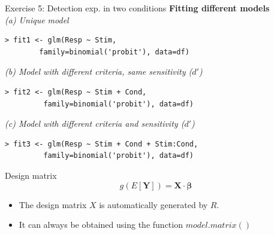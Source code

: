 \documentclass[10pt]{beamer}
\begin{document}
\begin{frame}[fragile]{Exercise 5: Detection exp. in two conditions}
\textbf{Fitting different models}\\[10pt]
\textit{(a) Unique model}
\begin{verbatim}
> fit1 <- glm(Resp ~ Stim, 
        family=binomial('probit'), data=df)
\end{verbatim}

\textit{(b) Model with different criteria, same sensitivity ($d'$)}
\begin{verbatim}
> fit2 <- glm(Resp ~ Stim + Cond, 
         family=binomial('probit'), data=df)
\end{verbatim}

\textit{(c) Model with different criteria and sensitivity ($d'$)}
\begin{verbatim}
> fit3 <- glm(Resp ~ Stim + Cond + Stim:Cond, 
         family=binomial('probit'), data=df)
\end{verbatim}

\end{frame}



\begin{frame}{Design matrix}
$$
g(E[\mathbf{Y}]) = \mathbf{X} \cdot \mathbf{\beta}
$$

\begin{itemize}
\item The design matrix $X$ is automatically generated by $R$.
\item It can always be obtained using the function $model.matrix()$
\end{itemize}
\end{frame}
\end{document}
